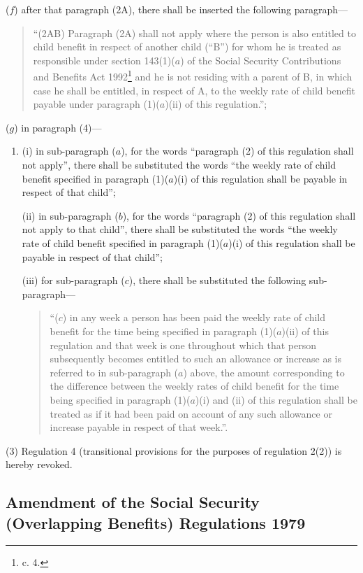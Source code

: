 \documentclass[a4paper]{article}
\newcommand\fnote[1]{\footnote{\frenchspacing #1}}
\begin{document}
\begin{enumerate}
($f$) after that paragraph (2A), there shall be inserted the following paragraph—
\begin{quotation}
“(2AB) Paragraph (2A) shall not apply where the person is also entitled to child benefit in respect of another child (“B”) for whom he is treated as responsible under section 143(1)($a$) of the Social Security Contributions and Benefits Act 1992\fnote{1992 c. 4.} and he is not residing with a parent of B, in which case he shall be entitled, in respect of A, to the weekly rate of child benefit payable under paragraph (1)($a$)(ii) of this regulation.”;
\end{quotation}

($g$) in paragraph (4)—
\begin{enumerate}\item[]
(i) in sub-paragraph ($a$), for the words “paragraph (2) of this regulation shall not apply”, there shall be substituted the words “the weekly rate of child benefit specified in paragraph (1)($a$)(i) of this regulation shall be payable in respect of that child”;

(ii) in sub-paragraph ($b$), for the words “paragraph (2) of this regulation shall not apply to that child”, there shall be substituted the words “the weekly rate of child benefit specified in paragraph (1)($a$)(i) of this regulation shall be payable in respect of that child”;

(iii) for sub-paragraph ($c$), there shall be substituted the following sub-paragraph—
\begin{quotation}
“($c$) in any week a person has been paid the weekly rate of child benefit for the time being specified in paragraph (1)($a$)(ii) of this regulation and that week is one throughout which that person subsequently becomes entitled to such an allowance or increase as is referred to in sub-paragraph ($a$) above, the amount corresponding to the difference between the weekly rates of child benefit for the time being specified in paragraph (1)($a$)(i) and (ii) of this regulation shall be treated as if it had been paid on account of any such allowance or increase payable in respect of that week.”.
\end{quotation}
\end{enumerate}
\end{enumerate}

(3)  Regulation 4 (transitional provisions for the purposes of regulation 2(2)) is hereby revoked.

\subsection[4. Amendment of the Social Security (Overlapping Benefits) Regulations 1979]{Amendment of the Social Security (Overlapping Benefits) Regulations 1979}
\end{document}
